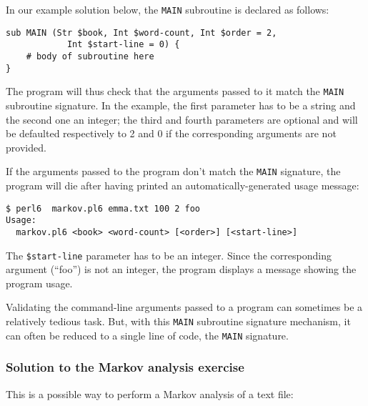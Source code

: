 In our example solution below, the {\tt MAIN} subroutine is declared 
as follows:

\begin{verbatim}
sub MAIN (Str $book, Int $word-count, Int $order = 2, 
            Int $start-line = 0) {
    # body of subroutine here
}
\end{verbatim}

The program will thus check that the arguments passed to it match 
the {\tt MAIN} subroutine signature. In the example, the first 
parameter has to be a string and the second one an integer; the 
third and fourth parameters are optional and will be defaulted 
respectively to 2 and 0 if the corresponding arguments are not 
provided.

If the arguments passed to the program don't match the {\tt MAIN} 
signature, the program will die after having printed an 
automatically-generated usage message:

\begin{verbatim}
$ perl6  markov.pl6 emma.txt 100 2 foo
Usage:
  markov.pl6 <book> <word-count> [<order>] [<start-line>]
\end{verbatim}
The \verb'$start-line' parameter has to be an integer. Since 
the corresponding argument (``foo'') is not an integer, the 
program displays a message showing the program usage.

Validating the command-line arguments passed to a program 
can sometimes be a relatively tedious task. But, with this 
{\tt MAIN} subroutine signature mechanism, it can often be 
reduced to a single line of code, the {\tt MAIN} signature.

\subsubsection{Solution to the Markov analysis exercise}

This is a possible way to perform a Markov analysis of a 
text file:

